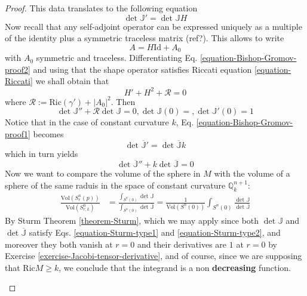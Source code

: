 \documentclass{book}
\begin{document}
\begin{proof}
This data translates to the following
equation
\begin{equation}
\label{equation-Bishop-Gromov-proof1}
\det\mathbb{J}'=\det\mathbb{J}H
\end{equation}
Now recall that any self-adjoint operator can
be expressed uniquely as a
multiple of the identity plus a symmetric
traceless matrix (ref?). This allows
to write
\begin{equation}
\label{equation-Bishop-Gromov-proof2}
A=H\text{Id}+A_0
\end{equation}
with $A_0$ symmetric and traceless.
Differentiating Eq.
\ref{equation-Bishop-Gromov-proof2} and using
that the shape operator satisfies
Riccati equation \ref{equation-Riccati} we
shall obtain that
$$
H'+H^2+\mathcal{R}=0
$$
where
$\mathcal{R}:=\text{Ric}(\gamma')+|A_0|^2$.
Then
\begin{equation}
\label{equation-Sturm-type1}
\det\mathbb{J}''+\mathcal{R}\det\mathbb{J}=0,
\det\mathbb{J}(0)=,\det\mathbb{J}'(0)=1
\end{equation}
\bigskip
Notice that in the case of constant curvature
$k$, Eq.
\ref{equation-Bishop-Gromov-proof1} becomes
\begin{equation}
\label{equation-Bishop-Gromov-proof3}
\det\overline{\mathbb{J}}'=
\det\overline{\mathbb{J}}k
\end{equation}
which in turn yields
\begin{equation}
\label{equation-Sturm-type2}
\det\overline{\mathbb{J}}''+
k\det\overline{\mathbb{J}}=0
\end{equation}
Now we want to compare the volume of the
sphere in $M$ with the volume of a
sphere of the same raduis in the space of
constant curvature
$\mathbb{Q}_k^{n+1}$:
$$
\begin{aligned}
\frac{\text{Vol}(S_r^{n}(p))}{\text{Vol}
(S^{n}_{r,k})}&=
\frac{\int_{S^n(0)}\det
\mathbb{J}}{\int_{S^n(0)}
\det\overline{\mathbb{J}}}
=\frac{1}{\text{Vol}(S^n(0))}
\int_{S^n(0)}\frac{\det\mathbb{J}}
{\det\overline{\mathbb{J}}}
\end{aligned}
$$
By Sturm Theorem \ref{theorem-Sturm}, which
we may apply since both
$\det\mathbb{J}$ and
$\det\overline{\mathbb{J}}$ satisfy Eqs.
 \ref{equation-Sturm-type1} and
 \ref{equation-Sturm-type2}, and moreover
they both vanish at $r=0$ and their
derivatives are $1$ at $r=0$ by Exercise
\ref{exercise-Jacobi-tensor-derivative}, and
of course, since we are supposing
that $\text{Ric}M\geq k$, we conclude that
the integrand is a non {\bf
decreasing} function.
\begin{remark}[Pregunta]

\end{remark}
\end{proof}
\end{document}
